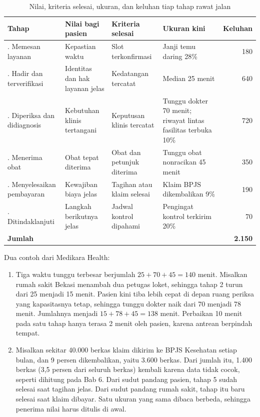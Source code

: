 \begin{table}[!htb]
  \centering
  \caption{Nilai, kriteria selesai, ukuran, dan keluhan tiap tahap rawat jalan}
  \label{tab:ch05-tahap-nilai}
  \small
  \begin{tabularx}{\textwidth}{>{\raggedright\arraybackslash}p{2.5cm}>{\raggedright\arraybackslash}X>{\raggedright\arraybackslash}p{2.6cm}>{\raggedright\arraybackslash}p{2.7cm}r}
    \hline
    \textbf{Tahap} & \textbf{Nilai bagi pasien} & \textbf{Kriteria selesai} & \textbf{Ukuran kini} & \textbf{Keluhan} \\
    \hline
    1. Memesan layanan & Kepastian waktu & Slot terkonfirmasi & Janji temu daring 28\% & 180 \\
    \hline
    2. Hadir dan terverifikasi & Identitas dan hak layanan jelas & Kedatangan tercatat & Median 25 menit & 640 \\
    \hline
    3. Diperiksa dan didiagnosis & Kebutuhan klinis tertangani & Keputusan klinis tercatat & Tunggu dokter 70 menit; riwayat lintas fasilitas terbuka 10\% & 720 \\
    \hline
    4. Menerima obat & Obat tepat diterima & Obat dan petunjuk diterima & Tunggu obat nonracikan 45 menit & 350 \\
    \hline
    5. Menyelesaikan pembayaran & Kewajiban biaya jelas & Tagihan atau klaim selesai & Klaim BPJS dikembalikan 9\% & 190 \\
    \hline
    6. Ditindaklanjuti & Langkah berikutnya jelas & Jadwal kontrol dipahami & Pengingat kontrol terkirim 20\% & 70 \\
    \hline
    \textbf{Jumlah} & & & & \textbf{2.150} \\
    \hline
  \end{tabularx}
\end{table}

Dua contoh dari Medikara Health:

\begin{enumerate}
  \item Tiga waktu tunggu terbesar berjumlah $25 + 70 + 45 = 140$ menit. Misalkan rumah sakit
        Bekasi menambah dua petugas loket, sehingga tahap 2 turun dari 25 menjadi 15 menit.
        Pasien kini tiba lebih cepat di depan ruang periksa yang kapasitasnya tetap, sehingga
        tunggu dokter naik dari 70 menjadi 78 menit. Jumlahnya menjadi $15 + 78 + 45 = 138$
        menit. Perbaikan 10 menit pada satu tahap hanya terasa 2 menit oleh pasien, karena
        antrean berpindah tempat.
  \item Misalkan sekitar 40.000 berkas klaim dikirim ke BPJS Kesehatan setiap bulan, dan 9
        persen dikembalikan, yaitu 3.600 berkas. Dari jumlah itu, 1.400 berkas (3,5 persen
        dari seluruh berkas) kembali karena data tidak cocok, seperti dihitung pada Bab 6.
        Dari sudut pandang pasien, tahap 5 sudah selesai saat tagihan jelas. Dari
        sudut pandang rumah sakit, tahap itu baru selesai saat klaim dibayar. Satu ukuran
        yang sama dibaca berbeda, sehingga penerima nilai harus ditulis di awal.
\end{enumerate}

